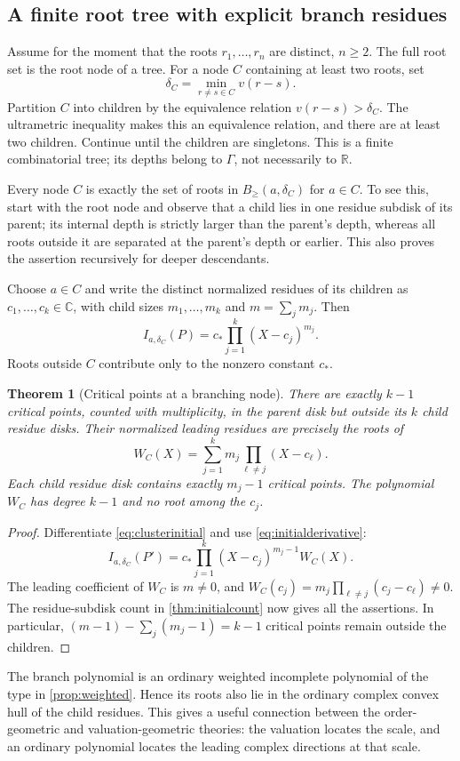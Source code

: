 \documentclass[11pt,letterpaper,oneside]{article}
\numberwithin{equation}{section}
\newtheorem{theorem}{Theorem}[section]
\theoremstyle{definition}
\theoremstyle{remark}\newtheorem{remark}[theorem]{Remark}
\newcommand{\C}{\mathbb C}\newcommand{\R}{\mathbb R}\newcommand{\Q}{\mathbb Q}
\newcommand{\Bcl}{B_{\geq}}\newcommand{\Bop}{B_{>}}
\begin{document}
\subsection{A finite root tree with explicit branch residues}
Assume for the moment that the roots $r_1,\ldots,r_n$ are distinct,
$n\geq2$. The full root set is the root node of a tree. For a node $C$
containing at least two roots, set
\[
 \delta_C=\min_{r\ne s\in C}v(r-s).
\]
Partition $C$ into children by the equivalence relation
$v(r-s)>\delta_C$. The ultrametric inequality makes this an equivalence
relation, and there are at least two children. Continue until the children
are singletons. This is a finite combinatorial tree; its depths belong to
$\Gamma$, not necessarily to $\R$.

Every node $C$ is exactly the set of roots in
$\Bcl(a,\delta_C)$ for $a\in C$. To see this, start with the root node
and observe that a child lies in one residue subdisk of its parent;
its internal depth is strictly larger than the parent's depth, whereas
all roots outside it are separated at the parent's depth or earlier.
This also proves the assertion recursively for deeper descendants.

Choose $a\in C$ and write the distinct normalized residues of its children
as $c_1,\ldots,c_k\in\C$, with child sizes $m_1,\ldots,m_k$ and
$m=\sum_jm_j$. Then
\begin{equation}\label{eq:clusterinitial}
 I_{a,\delta_C}(P)=c_*\prod_{j=1}^k(X-c_j)^{m_j}.
\end{equation}
Roots outside $C$ contribute only to the nonzero constant $c_*$.

\begin{theorem}[Critical points at a branching node]\label{thm:branch}
There are exactly $k-1$ critical points, counted with multiplicity, in
the parent disk but outside its $k$ child residue disks. Their normalized
leading residues are precisely the roots of
\begin{equation}\label{eq:branchpoly}
 W_C(X)=\sum_{j=1}^k m_j\prod_{\ell\ne j}(X-c_\ell).
\end{equation}
Each child residue disk contains exactly $m_j-1$ critical points.
The polynomial $W_C$ has degree $k-1$ and no root among the $c_j$.
\end{theorem}
\begin{proof}
Differentiate \eqref{eq:clusterinitial} and use
\eqref{eq:initialderivative}:
\[
 I_{a,\delta_C}(P')
 =c_*\prod_{j=1}^k(X-c_j)^{m_j-1}W_C(X).
\]
The leading coefficient of $W_C$ is $m\ne0$, and
$W_C(c_j)=m_j\prod_{\ell\ne j}(c_j-c_\ell)\ne0$.
The residue-subdisk count in \cref{thm:initialcount} now gives all the
assertions. In particular,
$(m-1)-\sum_j(m_j-1)=k-1$ critical points remain outside the children.
\end{proof}
The branch polynomial is an ordinary weighted incomplete polynomial of
the type in \cref{prop:weighted}. Hence its roots also lie in the ordinary
complex convex hull of the child residues. This gives a useful connection
between the order-geometric and valuation-geometric theories: the
valuation locates the scale, and an ordinary polynomial locates the
leading complex directions at that scale.
\end{document}
